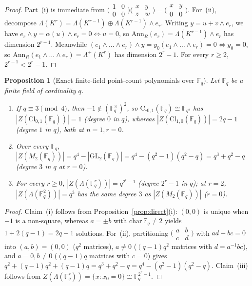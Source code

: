 \documentclass[11pt,a4paper]{article}
\newtheorem{proposition}[theorem]{Proposition}
\theoremstyle{definition}
\theoremstyle{remark}
\newcommand{\Cl}{\mathrm{Cl}}
\newcommand{\Ann}{\mathrm{Ann}}
\newcommand{\GL}{\mathrm{GL}}
\begin{document}
\begin{proof}
Part~(i) is immediate from $\bigl(\begin{smallmatrix} 1 & 0 \\ 0 & 0 \end{smallmatrix}\bigr)\bigl(\begin{smallmatrix} x & y \\ z & w \end{smallmatrix}\bigr) = \bigl(\begin{smallmatrix} x & y \\ 0 & 0 \end{smallmatrix}\bigr)$. For~(ii), decompose $\Lambda(K^r) = \Lambda(K^{r-1}) \oplus \Lambda(K^{r-1}) \wedge e_r$. Writing $y = u + v \wedge e_r$, we have $e_r \wedge y = \alpha(u) \wedge e_r = 0 \iff u = 0$, so $\Ann_R(e_r) = \Lambda(K^{r-1}) \wedge e_r$ has dimension $2^{r-1}$. Meanwhile $(e_1 \wedge \dots \wedge e_r) \wedge y = y_0 (e_1 \wedge \dots \wedge e_r) = 0 \iff y_0 = 0$, so $\Ann_R(e_1 \wedge \dots \wedge e_r) = \Lambda^+(K^r)$ has dimension $2^r - 1$. For every $r \ge 2$, $2^{r-1} < 2^r - 1$.
\end{proof}

\begin{proposition}[Exact finite-field point-count polynomials over $\mathbb{F}_q$]\label{prop:fq}
Let $\mathbb{F}_q$ be a finite field of cardinality $q$.
\begin{enumerate}
\setlength{\itemsep}{2pt}\setlength{\parskip}{0pt}
\item[(i)] If $q \equiv 3 \pmod 4$, then $-1 \notin (\mathbb{F}_q^\times)^2$, so $\Cl_{0,1}(\mathbb{F}_q) \cong \mathbb{F}_{q^2}$ has $|Z(\Cl_{0,1}(\mathbb{F}_q))| = 1$ (degree $0$ in $q$), whereas $|Z(\Cl_{1,0}(\mathbb{F}_q))| = 2q - 1$ (degree $1$ in $q$), both at $n = 1, r = 0$.
\item[(ii)] Over every $\mathbb{F}_q$, $|Z(M_2(\mathbb{F}_q))| = q^4 - |\GL_2(\mathbb{F}_q)| = q^4 - (q^2 - 1)(q^2 - q) = q^3 + q^2 - q$ (degree $3$ in $q$ at $r = 0$).
\item[(iii)] For every $r \ge 0$, $|Z(\Lambda(\mathbb{F}_q^r))| = q^{2^r - 1}$ (degree $2^r - 1$ in $q$); at $r = 2$, $|Z(\Lambda(\mathbb{F}_q^2))| = q^3$ has the same degree $3$ as $|Z(M_2(\mathbb{F}_q))|$ ($r = 0$).
\end{enumerate}
\end{proposition}

\begin{proof}
Claim~(i) follows from Proposition~\ref{prop:direct}(i): $(0, 0)$ is unique when $-1$ is a non-square, whereas $a = \pm b$ with $\mathrm{char}\,\mathbb{F}_q \neq 2$ yields $1 + 2(q - 1) = 2q - 1$ solutions. For~(ii), partitioning $\bigl(\begin{smallmatrix} a & b \\ c & d \end{smallmatrix}\bigr)$ with $ad - bc = 0$ into $(a, b) = (0, 0)$ ($q^2$ matrices), $a \neq 0$ ($(q - 1)q^2$ matrices with $d = a^{-1}bc$), and $a = 0, b \neq 0$ ($(q - 1)q$ matrices with $c = 0$) gives $q^2 + (q - 1)q^2 + (q - 1)q = q^3 + q^2 - q = q^4 - (q^2 - 1)(q^2 - q)$. Claim~(iii) follows from $Z(\Lambda(\mathbb{F}_q^r)) = \{x : x_0 = 0\} \cong \mathbb{F}_q^{2^r - 1}$.
\end{proof}
\end{document}
